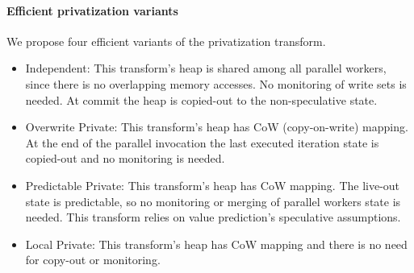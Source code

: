 \paragraph{Efficient privatization variants}
\label{novel_transf}
We propose four efficient variants of the privatization transform.
\begin{itemize}
%
\item Independent: This transform's heap is shared
  among all parallel workers, since there is no overlapping memory
  accesses.
  No monitoring of write sets is needed. At commit the heap is copied-out
  to the non-speculative state.
%


\item Overwrite Private: This transform's heap has
  CoW (copy-on-write) mapping. At the end of the parallel
  invocation the last executed iteration
  state is copied-out and no monitoring is needed.

%

\item Predictable Private: This transform's heap
  has CoW mapping. The live-out state is predictable, so no monitoring
  or merging of parallel workers state is needed. This transform
  relies on value prediction's speculative assumptions.

\item Local Private: This transform's heap has
  CoW mapping and there is no need for copy-out or monitoring.

\end{itemize}

%

